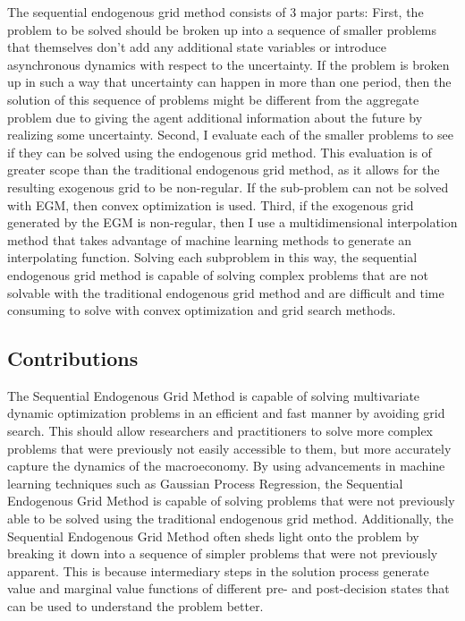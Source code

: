 \documentclass[\econtexRoot/EGMN]{subfiles}
\begin{document}
The sequential endogenous grid method consists of 3 major parts: First, the problem to be solved should be broken up into a sequence of smaller problems that themselves don't add any additional state variables or introduce asynchronous dynamics with respect to the uncertainty. If the problem is broken up in such a way that uncertainty can happen in more than one period, then the solution of this sequence of problems might be different from the aggregate problem due to giving the agent additional information about the future by realizing some uncertainty. Second, I evaluate each of the smaller problems to see if they can be solved using the endogenous grid method. This evaluation is of greater scope than the traditional endogenous grid method, as it allows for the resulting exogenous grid to be non-regular. If the sub-problem can not be solved with EGM, then convex optimization is used. Third, if the exogenous grid generated by the EGM is non-regular, then I use a multidimensional interpolation method that takes advantage of machine learning methods to generate an interpolating function. Solving each subproblem in this way, the sequential endogenous grid method is capable of solving complex problems that are not solvable with the traditional endogenous grid method and are difficult and time consuming to solve with convex optimization and grid search methods.

\subsection{Contributions} %


The Sequential Endogenous Grid Method is capable of solving multivariate dynamic optimization problems in an efficient and fast manner by avoiding grid search. This should allow researchers and practitioners to solve more complex problems that were previously not easily accessible to them, but more accurately capture the dynamics of the macroeconomy. By using advancements in machine learning techniques such as Gaussian Process Regression, the Sequential Endogenous Grid Method is capable of solving problems that were not previously able to be solved using the traditional endogenous grid method. Additionally, the Sequential Endogenous Grid Method often sheds light onto the problem by breaking it down into a sequence of simpler problems that were not previously apparent. This is because intermediary steps in the solution process generate value and marginal value functions of different pre- and post-decision states that can be used to understand the problem better.
\end{document}
